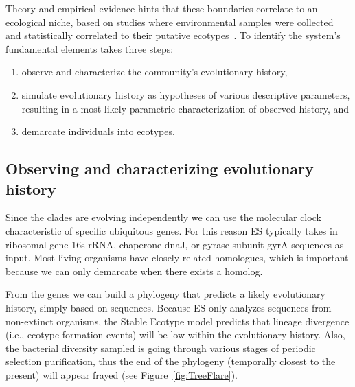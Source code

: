Theory and empirical evidence hints that these boundaries correlate to an ecological niche, based on studies where environmental samples were collected and statistically correlated to their putative ecotypes~\cite{cohan2007systematics, cohan2006sequence, ward2006cyanobacterial, cohan2006toward}.
To identify the system's fundamental elements takes three steps:
\begin{enumerate}[I]
\item observe and characterize the community's evolutionary history,
\item simulate evolutionary history as hypotheses of various descriptive parameters, resulting in a most likely parametric characterization of observed history, and
\item demarcate individuals into ecotypes.
\end{enumerate}

\subsection*{Observing and characterizing evolutionary history}
Since the clades are evolving independently we can use the molecular clock characteristic of specific ubiquitous genes.
For this reason ES typically takes in ribosomal gene 16s rRNA, chaperone dnaJ, or gyrase subunit gyrA sequences  as input. Most living organisms have closely related homologues, which is important because we can only demarcate when there exists a homolog.

From the genes we can build a phylogeny that predicts a likely evolutionary history, simply based on sequences.
Because ES only analyzes sequences from non-extinct organisms, the Stable Ecotype model predicts that lineage divergence (i.e., ecotype formation events) will be low within the evolutionary history.
Also, the bacterial diversity sampled is going through various stages of periodic selection purification, thus the end of the phylogeny (temporally closest to the present) will appear frayed (see Figure~\ref{fig:TreeFlare}).

